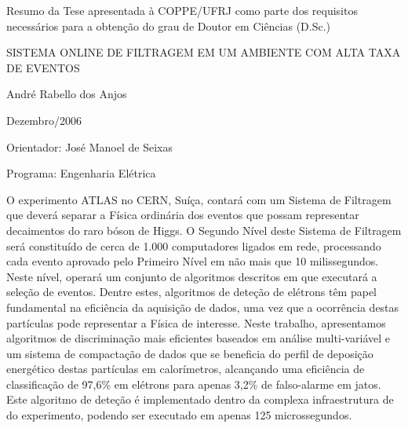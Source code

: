 \newenvironment{summary}[1]{%
\begin{minipage}{\textwidth}%
\newcommand{\saveparameter}{\baselinestretch}%
\renewcommand{\baselinestretch}{#1}%
\normalsize}%
{%
\renewcommand{\baselinestretch}{\saveparameter}%
\end{minipage}%
}


\noindent
Resumo da Tese apresentada à COPPE/UFRJ como parte dos requisitos necessários
para a obtenção do grau de Doutor em Ciências (D.Sc.)

\vspace{1.5cm}

\begin{center}
SISTEMA ONLINE DE FILTRAGEM EM UM AMBIENTE COM ALTA TAXA DE EVENTOS
\vspace{1cm}

André Rabello dos Anjos
\vspace{1cm}

Dezembro/2006
\end{center}
\vspace{1.5cm}

\noindent
Orientador: José Manoel de Seixas
\vspace{1.5cm}

\noindent
Programa: Engenharia Elétrica
\vspace{2cm}

\noindent \begin{summary}{1.2}
\hspace{0.8cm}O experimento ATLAS no CERN, Suíça, contará com um Sistema de
Filtragem que deverá separar a Física ordinária dos eventos que possam
representar decaimentos do raro bóson de Higgs. O Segundo Nível deste Sistema
de Filtragem será constituído de cerca de 1.000 computadores ligados em rede,
processando cada evento aprovado pelo Primeiro Nível em não mais que 10
milissegundos. Neste nível, operará um conjunto de algoritmos descritos em
 que executará a seleção de eventos. Dentre estes, algoritmos de
deteção de elétrons têm papel fundamental na eficiência da aquisição de dados,
uma vez que a ocorrência destas partículas pode representar a Física de
interesse. Neste trabalho, apresentamos algoritmos de discriminação mais
eficientes baseados em análise multi-variável e um sistema de compactação de
dados que se beneficia do perfil de deposição energético destas partículas em
calorímetros, alcançando uma eficiência de classificação de 97,6\% em elétrons
para apenas 3,2\% de falso-alarme em jatos. Este algoritmo de deteção é
implementado dentro da complexa infraestrutura de  do
experimento, podendo ser executado em apenas 125 microssegundos.
\end{summary}

